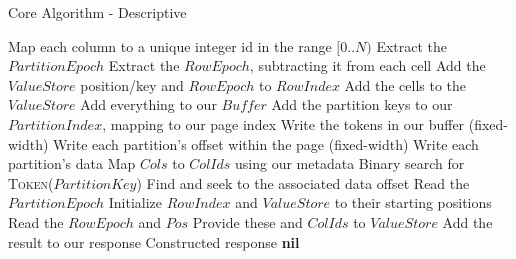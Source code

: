 \documentclass[fleqn]{article}
\begin{document}
\begin{algorithm}
\scriptsize
\caption{Core Algorithm - Descriptive}
\begin{algorithmic}[1]
\State Map each column to a unique integer id in the range $[0..N)$
 \State Extract the $PartitionEpoch$
   \State Extract the $RowEpoch$, subtracting it from each cell
   \State Add the $ValueStore$ position/key and $RowEpoch$ to $RowIndex$
   \State Add the cells to the $ValueStore$
 \EndFor
 \State Add everything to our $Buffer$
   \State Add the partition keys to our $PartitionIndex$, mapping to our page index
   \State Write the tokens in our buffer (fixed-width)
   \State Write each partition's offset within the page (fixed-width)
   \State Write each partition's data
 \EndIf
\EndFor
\EndProcedure
\Statex
{}
\State Map $Cols$ to $ColIds$ using our metadata
 \State Binary search for \textsc{Token}($PartitionKey$)
  \State Find and seek to the associated data offset
   \State Read the $PartitionEpoch$
   \State Initialize $RowIndex$ and $ValueStore$ to their starting positions
     \State Read the $RowEpoch$ and $Pos$
     \State Provide these and $ColIds$ to $ValueStore$
     \State Add the result to our response
   \EndFor
   \Return Constructed response
  \EndIf
 \EndFor
\EndFor
\Return \textbf{nil}
\EndFunction
\end{algorithmic}
\end{algorithm}
\end{document}
